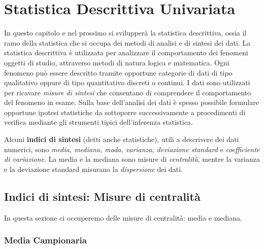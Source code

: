 {}



\chapter{Statistica Descrittiva Univariata}\label{cap3}

In questo capitolo e nel prossimo si svilupperà la statistica descrittiva, ossia il ramo della statistica che si occupa dei metodi di analisi e di sintesi dei dati. La statistica descrittiva è utilizzata per analizzare il comportamento dei fenomeni oggetti di studio, attraverso metodi di natura logica e matematica. Ogni fenomeno può essere descritto tramite opportune categorie di dati di tipo qualitativo oppure di tipo quantitativo discreti o continui. I dati sono utilizzati per ricavare \textit{misure di sintesi} che consentano di comprendere il comportamento del fenomeno in esame. Sulla base dell'analisi dei dati è spesso possibile formulare opportune ipotesi statistiche da sottoporre successivamente a procedimenti di verifica mediante gli strumenti tipici dell'inferenza statistica.

Alcuni \textbf{indici di sintesi} (detti anche statistiche), utili a descrivere dei dati numerici, sono \textit{media, mediana, moda, varianza, deviazione standard} e \textit{coefficiente di variazione}. La media e la mediana sono misure di \textit{centralità}, mentre la varianza e la deviazione standard misurano la \textit{dispersione} dei dati.

\section{Indici di sintesi: Misure di centralità}\label{cap3.1}

In questa sezione ci occuperemo delle misure di centralità: media e mediana.

\subsection{Media Campionaria}\label{cap3.1.1}

